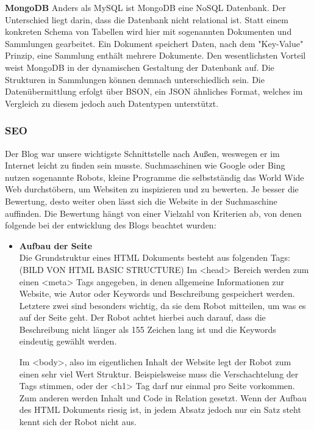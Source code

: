 {    \textbf{MongoDB}
    Anders als MySQL ist {MongoDB\cite{mongodb}} eine NoSQL Datenbank. Der Unterschied liegt darin, dass die Datenbank nicht relational ist. Statt einem konkreten Schema von Tabellen
    wird hier mit sogenannten Dokumenten und Sammlungen gearbeitet. Ein Dokument speichert Daten, nach dem "Key-Value" Prinzip, eine Sammlung enthält mehrere Dokumente.
    Den wesentlichsten Vorteil weist MongoDB in der dynamischen Gestaltung der Datenbank auf. Die Strukturen in Sammlungen können demnach unterschiedlich sein. Die
    Datenübermittlung erfolgt über {BSON\cite{bson}}, ein JSON ähnliches Format, welches im Vergleich zu diesem jedoch auch Datentypen unterstützt.

    \subsubsection{SEO}
    Der Blog war unsere wichtigste Schnittstelle nach Außen, weswegen er im Internet leicht zu finden sein musste. Suchmaschinen wie Google oder Bing nutzen
    sogenannte Robots, kleine Programme die selbstständig das World Wide Web durchstöbern, um Websiten zu inspizieren und zu bewerten. Je besser die Bewertung,
    desto weiter oben lässt sich die Website in der Suchmaschine auffinden.
    Die Bewertung hängt von einer Vielzahl von Kriterien ab, von denen folgende bei der entwicklung des Blogs beachtet wurden:

    \begin{itemize}
      \item \textbf{Aufbau der Seite}\\
        Die Grundstruktur eines HTML Dokuments besteht aus folgenden Tags:
        (BILD VON HTML BASIC STRUCTURE)
        Im <head> Bereich werden zum einen <meta> Tags angegeben, in denen allgemeine Informationen zur Website, wie Autor oder Keywords und Beschreibung gespeichert werden.
        Letztere zwei sind besonders wichtig, da sie dem Robot mitteilen, um was es auf der Seite geht. Der Robot achtet hierbei auch darauf, dass die Beschreibung nicht
        länger als 155 Zeichen lang ist und die Keywords eindeutig gewählt werden.

        Im <body>, also im eigentlichen Inhalt der Website legt der Robot zum einen sehr viel Wert Struktur. Beispielsweise muss die Verschachtelung der Tags stimmen, oder der <h1> Tag darf nur einmal pro Seite
        vorkommen. Zum anderen werden Inhalt und Code in Relation gesetzt. Wenn der Aufbau des HTML Dokuments riesig ist, in jedem Absatz jedoch nur ein Satz steht kennt sich der Robot nicht aus.


\end{itemize}}
